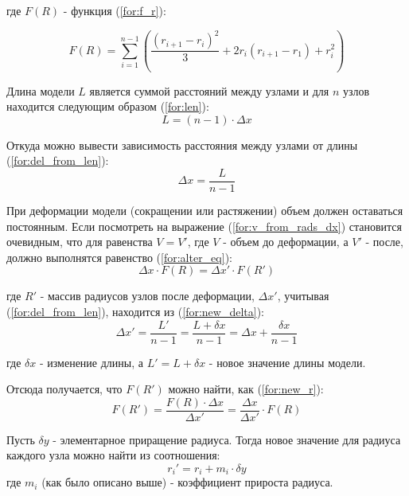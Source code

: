 где $F(R)$ - функция (\ref{for:f_r}):

\begin{equation}
    \label{for:f_r}
    F(R) = \sum_{i=1}^{n-1} \left(\frac{(r_{i + 1} - r_i)^2}{3} + 2 r_i (r_{i + 1} - r_1) + r_i^2 \right)
\end{equation}


Длина модели $L$ является суммой расстояний между узлами и для $n$ узлов находится следующим образом (\ref{for:len}):
\begin{equation}
    \label{for:len}
    L = (n - 1) \cdot \Delta x
\end{equation}

Откуда можно вывести зависимость расстояния между узлами от длины (\ref{for:del_from_len}):
\begin{equation}
    \label{for:del_from_len}
    \Delta x = \frac{L}{n - 1}
\end{equation}

При деформации модели (сокращении или растяжении) объем должен оставаться постоянным. Если посмотреть на выражение (\ref{for:v_from_rads_dx}) становится очевидным, что для равенства $V = V'$, где $V$ - объем до деформации, а $V'$ - после, должно выполнятся равенство (\ref{for:alter_eq}):
\begin{equation}
    \label{for:alter_eq}
    \Delta x \cdot F(R) = \Delta x' \cdot F(R')
\end{equation}

где $R'$ - массив радиусов узлов после деформации, $\Delta x'$, учитывая (\ref{for:del_from_len}), находится из (\ref{for:new_delta}):
\begin{equation}
    \label{for:new_delta}
    \Delta x' = \frac{L'}{n - 1} = \frac{L + \delta x}{n - 1} = \Delta x + \frac{\delta x}{n - 1}
\end{equation}

где $\delta x$ - изменение длины, а $L' = L + \delta x$ - новое значение длины модели.

Отсюда получается, что $F(R')$ можно найти, как (\ref{for:new_r}):
\begin{equation}
    \label{for:new_r}
    F(R') = \frac{F(R) \cdot \Delta x}{\Delta x'} = \frac{\Delta x}{\Delta x'} \cdot F(R)
\end{equation}

Пусть $\delta y$ - элементарное приращение радиуса. Тогда новое значение для радиуса каждого узла можно найти из соотношения:
\begin{equation}
    \label{for:new_rad}
    r_i' = r_i + m_i \cdot \delta y
\end{equation}
где $m_i$ (как было описано выше) - коэффициент прироста радиуса.

